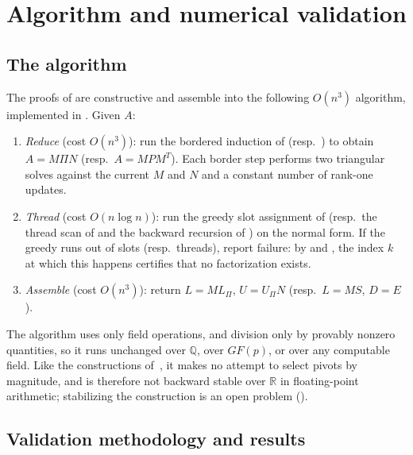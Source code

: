\section{Algorithm and numerical validation}\label{sec:validation}

\subsection{The algorithm}

The proofs of  are constructive and assemble into
the following $O(n^3)$ algorithm, implemented in
.  Given $A$:
\begin{enumerate}
  \item \emph{Reduce} (cost $O(n^3)$): run the bordered induction of
     (resp.\ ) to obtain
    $A = M \Pi N$ (resp.\ $A = M P M^T$).  Each border step performs two
    triangular solves against the current $M$ and $N$ and a constant
    number of rank-one updates.
  \item \emph{Thread} (cost $O(n \log n)$): run the greedy slot assignment
    of  (resp.\ the thread scan of
     and the backward recursion of
    ) on the normal form.  If the greedy runs out of
    slots (resp.\ threads), report failure: by
     and
    , the index $k$ at which this happens certifies
    that no factorization exists.
  \item \emph{Assemble} (cost $O(n^3)$): return
    $L = M L_\Pi$, $U = U_\Pi N$ (resp.\ $L = M S$, $D = E$).
\end{enumerate}
The algorithm uses only field operations, and division only by provably
nonzero quantities, so it runs unchanged over $\mathbb{Q}$, over $GF(p)$,
or over any computable field.  Like the constructions
of~\cite{okunev_johnson_2005,darve_lu_2026}, it makes no attempt to select
pivots by magnitude, and is therefore not backward stable over
$\mathbb{R}$ in floating-point arithmetic; stabilizing the construction is
an open problem ().

\subsection{Validation methodology and results}

